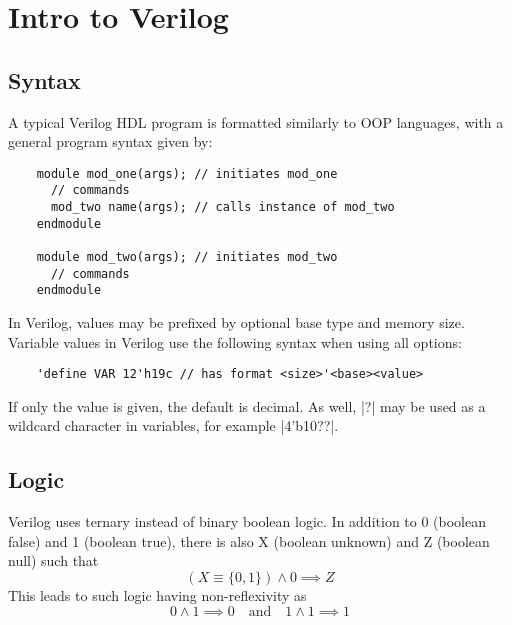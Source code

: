 \documentclass[oneside,11pt]{book}
\begin{document}
\chapter{Intro to Verilog}

\section{Syntax}

A typical Verilog HDL program is formatted similarly to OOP languages, with a general program syntax given by:
\begin{verbatim}
	module mod_one(args); // initiates mod_one
	  // commands
	  mod_two name(args); // calls instance of mod_two
	endmodule

	module mod_two(args); // initiates mod_two
	  // commands
	endmodule
\end{verbatim}

In Verilog, values may be prefixed by optional base type and memory size. Variable values in Verilog use the following syntax when using all options:
\begin{verbatim}
	'define VAR 12'h19c // has format <size>'<base><value>
\end{verbatim}
If only the value is given, the default is decimal. As well, \cverb|?| may be used as a wildcard character in variables, for example \cverb|4'b10??|.

\section{Logic}
Verilog uses ternary instead of binary boolean logic. In addition to 0 (boolean false) and 1 (boolean true), there is also X (boolean unknown) and Z (boolean null) such that \begin{equation}
	(X \equiv \{0, 1\} ) \land 0 \implies Z
\end{equation}
This leads to such logic having non-reflexivity as \begin{equation}
	0 \land 1 \implies 0 \quad\text{and}\quad 1 \land 1 \implies 1
\end{equation}
\end{document}
